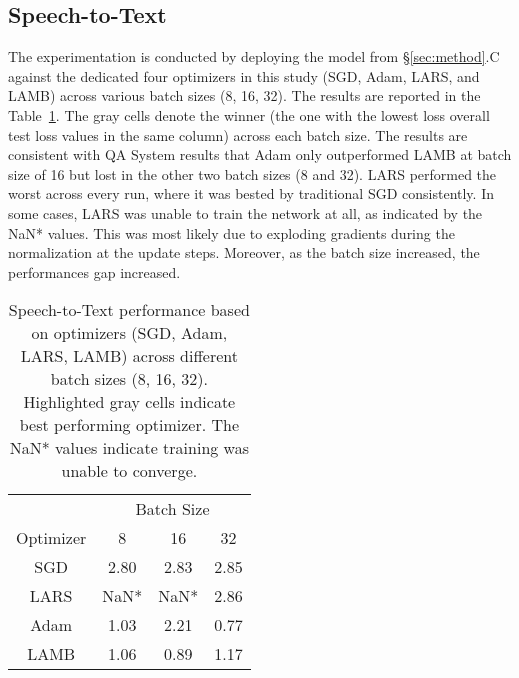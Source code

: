 \subsection{Speech-to-Text}

The experimentation is conducted by deploying the model from \S\ref{sec:method}.C against the dedicated four optimizers in this study (SGD, Adam, LARS, and LAMB) across various batch sizes (8, 16, 32). The results are reported in the Table~\ref{tbl:speech_results}. The gray cells denote the winner (the one with the lowest loss overall test loss values in the same column) across each batch size. The results are consistent with QA System results that Adam only outperformed LAMB at batch size of 16 but lost in the other two batch sizes (8 and 32). LARS performed the worst across every run, where it was bested by traditional SGD consistently. In some cases, LARS was unable to train the network at all, as indicated by the NaN* values. This was most likely due to exploding gradients during the normalization at the update steps. Moreover, as the batch size increased, the performances gap increased.

\begin{table}[!t]
\vspace{-5pt}
\small
\vspace{7pt}
\caption{Speech-to-Text performance based on optimizers (SGD, Adam, LARS, LAMB) across different batch sizes (8, 16, 32). Highlighted gray cells indicate best performing optimizer. The NaN* values indicate training was unable to converge.}\label{tbl:speech_results}
\vspace{-10pt}
\begin{center}
\begin{tabular}{ c|c|c|c}
 &  \multicolumn{3}{c}{Batch Size}\\ 
\cline{2-4}
\multicolumn{1}{c|}{Optimizer} &
 \multicolumn{1}{c|}{8} &
 \multicolumn{1}{c|}{16} &
 \multicolumn{1}{c}{32}  \\
\hline
SGD & 2.80 & 2.83 & 2.85 \\
LARS & NaN* & NaN* & 2.86 \\
Adam & \cellcolor{gray!30} 1.03 & 2.21 & \cellcolor{gray!30}  0.77 \\
LAMB & 1.06 & \cellcolor{gray!30} 0.89 & 1.17 \\
\end{tabular}
\end{center}
\vspace{-15pt}
\end{table}